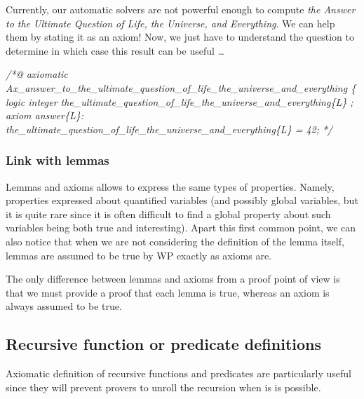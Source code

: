 \documentclass[12pt,francais,]{scrbook}
\newenvironment{Shaded}{}{}
\newcommand{\CommentTokAlt}[1]{\textcolor[rgb]{0.18,0.33,0.39}{\textit{{#1}}}}
\newenvironment{zdssecretblock}[1]{%
  \tcolorbox[beamer,%
    noparskip,breakable,
    colback=LightGray,colframe=DarkGray,%
    colbacklower=LightGray,%
    title=#1]
}{\endtcolorbox}
\begin{document}
\begin{zdssecretblock}{Off topic}
  Currently, our automatic solvers are not
  powerful enough to compute \emph{the Answer to the Ultimate
Question of Life, the Universe, and Everything}. We can help
them by stating it as an axiom! Now, we just have to 
understand the question to determine in which case this result can be
useful \ldots{}
  \begin{footnotesize}\begin{Shaded}
\begin{Highlighting}[]
\CommentTokAlt{/*@}
\CommentTokAlt{  axiomatic Ax_answer_to_the_ultimate_question_of_life_the_universe_and_everything \{}
\CommentTokAlt{    logic integer the_ultimate_question_of_life_the_universe_and_everything\{L\} ;}
\CommentTokAlt{}
\CommentTokAlt{    axiom answer\{L\}:}
\CommentTokAlt{      the_ultimate_question_of_life_the_universe_and_everything\{L\} = 42;}
\CommentTokAlt{}
\CommentTokAlt{*/}
\end{Highlighting}
    \end{Shaded}\end{footnotesize}
\end{zdssecretblock}

\subsubsection{Link with lemmas}\label{link-with-lemmas}

Lemmas and axioms allows to express the same types of properties.
Namely, properties expressed about quantified variables (and possibly
global variables, but it is quite rare since it is often difficult to
find a global property about such variables being both true and
interesting). Apart this first common point, we can also notice that
when we are not considering the definition of the lemma itself, lemmas
are assumed to be true by WP exactly as axioms are.

The only difference between lemmas and axioms from a proof point of view
is that we must provide a proof that each lemma is true, whereas an
axiom is always assumed to be true.

\subsection{Recursive function or predicate
definitions}\label{recursive-function-or-predicate-definitions}

Axiomatic definition of recursive functions and predicates are
particularly useful since they will prevent provers to unroll the
recursion when is is possible.
\end{document}
